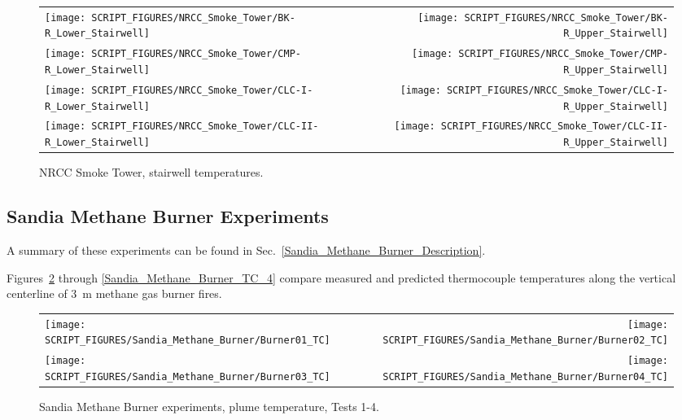 \begin{figure}[p]
\begin{tabular*}{\textwidth}{l@{\extracolsep{\fill}}r}
\texttt{[image: SCRIPT\_FIGURES/NRCC\_Smoke\_Tower/BK-R\_Lower\_Stairwell]} &
\texttt{[image: SCRIPT\_FIGURES/NRCC\_Smoke\_Tower/BK-R\_Upper\_Stairwell]} \\
\texttt{[image: SCRIPT\_FIGURES/NRCC\_Smoke\_Tower/CMP-R\_Lower\_Stairwell]} &
\texttt{[image: SCRIPT\_FIGURES/NRCC\_Smoke\_Tower/CMP-R\_Upper\_Stairwell]} \\
\texttt{[image: SCRIPT\_FIGURES/NRCC\_Smoke\_Tower/CLC-I-R\_Lower\_Stairwell]} &
\texttt{[image: SCRIPT\_FIGURES/NRCC\_Smoke\_Tower/CLC-I-R\_Upper\_Stairwell]} \\
\texttt{[image: SCRIPT\_FIGURES/NRCC\_Smoke\_Tower/CLC-II-R\_Lower\_Stairwell]} &
\texttt{[image: SCRIPT\_FIGURES/NRCC\_Smoke\_Tower/CLC-II-R\_Upper\_Stairwell]}
\end{tabular*}
\caption[NRCC Smoke Tower, stairwell temperatures]{NRCC Smoke Tower, stairwell temperatures.}
\label{NRCC_Smoke_Tower_Stairwell}
\end{figure}



\clearpage

\subsection{Sandia Methane Burner Experiments}
\label{Sandia_Methane_Burner_Plume_Temperature}

A summary of these experiments can be found in Sec.~\ref{Sandia_Methane_Burner_Description}.

Figures~\ref{Sandia_Methane_Burner_TC_1} through \ref{Sandia_Methane_Burner_TC_4} compare measured and predicted thermocouple temperatures along the vertical centerline of 3~m methane gas burner fires.

\begin{figure}[!ht]
\begin{tabular*}{\textwidth}{l@{\extracolsep{\fill}}r}
\texttt{[image: SCRIPT\_FIGURES/Sandia\_Methane\_Burner/Burner01\_TC]} &
\texttt{[image: SCRIPT\_FIGURES/Sandia\_Methane\_Burner/Burner02\_TC]} \\
\texttt{[image: SCRIPT\_FIGURES/Sandia\_Methane\_Burner/Burner03\_TC]} &
\texttt{[image: SCRIPT\_FIGURES/Sandia\_Methane\_Burner/Burner04\_TC]}
\end{tabular*}
\caption[Sandia Methane Burner, plume temperature, Tests 1-4]{Sandia Methane Burner experiments, plume temperature, Tests 1-4.}
\label{Sandia_Methane_Burner_TC_1}
\end{figure}

